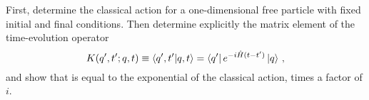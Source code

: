 \begin{ex} \label{ex_22} 
    First, determine the classical action for a one-dimensional free particle with fixed initial and final conditions. Then determine explicitly the matrix element of the time-evolution operator
    \begin{equation}
        \label{ex_22_result}
        K(q',t'; q,t) \equiv \bra{q', t'}\ket{q, t} = \bra{q'}e^{-i\hat{H}(t-t')}\ket{q}\,,
    \end{equation}
    and show that is equal to the exponential of the classical action, times a factor of $i$. 
\end{ex}


